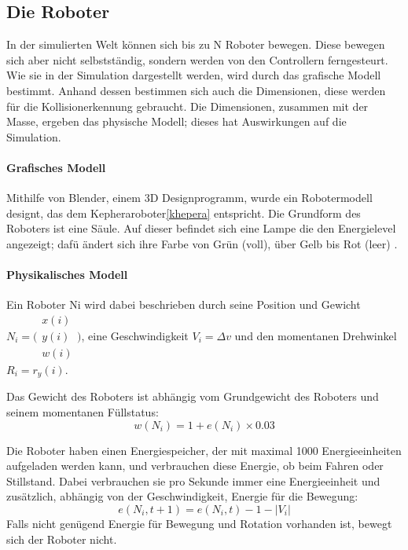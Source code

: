 \subsection{Die Roboter}\label{robot}
In der simulierten Welt k{\"{o}}nnen sich bis zu \gls{N} Roboter bewegen. Diese bewegen sich aber nicht selbstst{\"{a}}ndig, sondern werden von den Controllern ferngesteurt.
Wie sie in der Simulation dargestellt werden, wird durch das grafische Modell bestimmt. Anhand dessen bestimmen sich auch die Dimensionen, diese werden f{\"{u}}r die Kollisionerkennung
gebraucht. Die Dimensionen, zusammen mit der Masse, ergeben das physische Modell; dieses hat Auswirkungen auf die Simulation.

\paragraph{Grafisches Modell} Mithilfe von Blender, einem 3D Designprogramm, wurde ein Robotermodell designt, das dem Kepheraroboter\ref{khepera} entspricht. Die Grundform des Roboters ist
eine S{\"{a}}ule. Auf dieser befindet sich eine Lampe die den Energielevel angezeigt; daf{\"{u}} {\"{a}}ndert sich ihre Farbe von Gr{\"{u}}n (voll), {\"{u}}ber Gelb bis Rot (leer) .


\paragraph{Physikalisches Modell}
Ein Roboter \gls{Ni} wird dabei beschrieben durch seine Position und Gewicht
$ N_i = \bigl(\begin{smallmatrix} x(i) \\ y(i) \\ w(i) \end{smallmatrix}\bigr)$, eine
Geschwindigkeit $ V_i = \Delta v $ und den momentanen Drehwinkel
$ R_i = r_y(i)$. 

Das Gewicht des Roboters ist abh{\"{a}}ngig vom Grundgewicht des Roboters und seinem momentanen F{\"{u}}llstatus: 
\begin{equation}\label{eq:w}
 w(N_i) = 1 + e(N_i) \times 0.03
\end{equation}

Die Roboter haben einen Energiespeicher, der mit maximal 1000 Energieeinheiten
aufgeladen werden kann, und verbrauchen diese Energie, ob beim Fahren oder
Stillstand. Dabei verbrauchen sie pro Sekunde immer eine Energieeinheit und zus{\"{a}}tzlich, abh{\"{a}}ngig von der Geschwindigkeit, Energie f{\"{u}}r die Bewegung:
\begin{equation}\label{eq:entladen}
	e(N_i, t + 1) = e(N_i, t) - 1 - |V_i|
\end{equation}
Falls nicht gen{\"{u}}gend Energie f{\"{u}}r Bewegung und Rotation vorhanden ist, bewegt sich der Roboter nicht.

